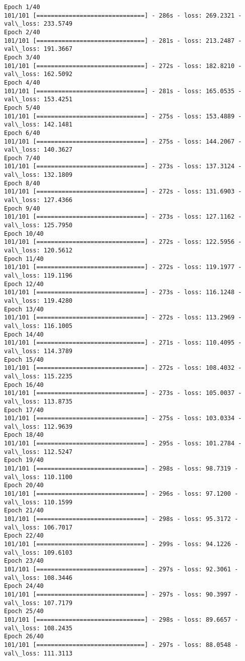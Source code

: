 \documentclass[11pt]{article}
\begin{document}
    \begin{Verbatim}[commandchars=\\\{\}]
Epoch 1/40
101/101 [==============================] - 286s - loss: 269.2321 - val\_loss: 233.5749
Epoch 2/40
101/101 [==============================] - 281s - loss: 213.2487 - val\_loss: 191.3667
Epoch 3/40
101/101 [==============================] - 272s - loss: 182.8210 - val\_loss: 162.5092
Epoch 4/40
101/101 [==============================] - 281s - loss: 165.0535 - val\_loss: 153.4251
Epoch 5/40
101/101 [==============================] - 275s - loss: 153.4889 - val\_loss: 142.1481
Epoch 6/40
101/101 [==============================] - 275s - loss: 144.2067 - val\_loss: 140.3627
Epoch 7/40
101/101 [==============================] - 273s - loss: 137.3124 - val\_loss: 132.1809
Epoch 8/40
101/101 [==============================] - 272s - loss: 131.6903 - val\_loss: 127.4366
Epoch 9/40
101/101 [==============================] - 273s - loss: 127.1162 - val\_loss: 125.7950
Epoch 10/40
101/101 [==============================] - 272s - loss: 122.5956 - val\_loss: 120.5612
Epoch 11/40
101/101 [==============================] - 272s - loss: 119.1977 - val\_loss: 119.1196
Epoch 12/40
101/101 [==============================] - 273s - loss: 116.1248 - val\_loss: 119.4280
Epoch 13/40
101/101 [==============================] - 272s - loss: 113.2969 - val\_loss: 116.1005
Epoch 14/40
101/101 [==============================] - 271s - loss: 110.4095 - val\_loss: 114.3789
Epoch 15/40
101/101 [==============================] - 272s - loss: 108.4032 - val\_loss: 115.2235
Epoch 16/40
101/101 [==============================] - 273s - loss: 105.0037 - val\_loss: 113.8735
Epoch 17/40
101/101 [==============================] - 275s - loss: 103.0334 - val\_loss: 112.9639
Epoch 18/40
101/101 [==============================] - 295s - loss: 101.2784 - val\_loss: 112.5247
Epoch 19/40
101/101 [==============================] - 298s - loss: 98.7319 - val\_loss: 110.1100
Epoch 20/40
101/101 [==============================] - 296s - loss: 97.1200 - val\_loss: 110.1599
Epoch 21/40
101/101 [==============================] - 298s - loss: 95.3172 - val\_loss: 106.7017
Epoch 22/40
101/101 [==============================] - 299s - loss: 94.1226 - val\_loss: 109.6103
Epoch 23/40
101/101 [==============================] - 297s - loss: 92.3061 - val\_loss: 108.3446
Epoch 24/40
101/101 [==============================] - 297s - loss: 90.3997 - val\_loss: 107.7179
Epoch 25/40
101/101 [==============================] - 298s - loss: 89.6657 - val\_loss: 108.2435
Epoch 26/40
101/101 [==============================] - 297s - loss: 88.0548 - val\_loss: 111.3113

\end{Verbatim}
\end{document}
